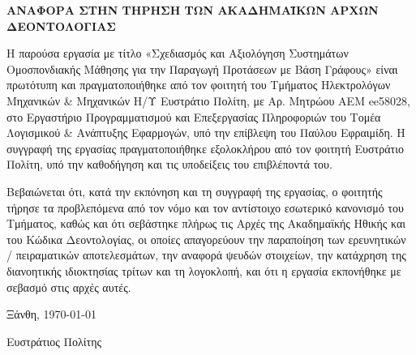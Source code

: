 \thispagestyle{empty}
\begin{center}
    {\bfseries\sffamily ΑΝΑΦΟΡΑ ΣΤΗΝ ΤΗΡΗΣΗ ΤΩΝ ΑΚΑΔΗΜΑΪΚΩΝ ΑΡΧΩΝ ΔΕΟΝΤΟΛΟΓΙΑΣ}
\end{center}
\vspace{1.5cm}

\noindent Η παρούσα εργασία με τίτλο «Σχεδιασμός και Αξιολόγηση Συστημάτων Ομοσπονδιακής Μάθησης για την Παραγωγή Προτάσεων με Βάση Γράφους» είναι πρωτότυπη και πραγματοποιήθηκε από τον φοιτητή του Τμήματος Ηλεκτρολόγων Μηχανικών \& Μηχανικών Η/Υ Ευστράτιο Πολίτη, με Αρ. Μητρώου ΑΕΜ ee58028, στο Εργαστήριο Προγραμματισμού και Επεξεργασίας Πληροφοριών του Τομέα Λογισμικού \& Ανάπτυξης Εφαρμογών, υπό την επίβλεψη του Παύλου Εφραιμίδη. Η συγγραφή της εργασίας πραγματοποιήθηκε εξολοκλήρου από τον φοιτητή Ευστράτιο Πολίτη, υπό την καθοδήγηση και τις υποδείξεις του επιβλέποντά του.

\vspace{0.8em}
\noindent Βεβαιώνεται ότι, κατά την εκπόνηση και τη συγγραφή της εργασίας, ο φοιτητής τήρησε τα προβλεπόμενα από τον νόμο και τον αντίστοιχο εσωτερικό κανονισμό του Τμήματος, καθώς και ότι σεβάστηκε πλήρως τις Αρχές της Ακαδημαϊκής Ηθικής και του Κώδικα Δεοντολογίας, οι οποίες απαγορεύουν την παραποίηση των ερευνητικών / πειραματικών αποτελεσμάτων, την αναφορά ψευδών στοιχείων, την κατάχρηση της διανοητικής ιδιοκτησίας τρίτων και τη λογοκλοπή, και ότι η εργασία εκπονήθηκε με σεβασμό στις αρχές αυτές.

\vspace{2.5cm}
\noindent Ξάνθη, \today
\vspace{1.5em}

\noindent Ευστράτιος Πολίτης
